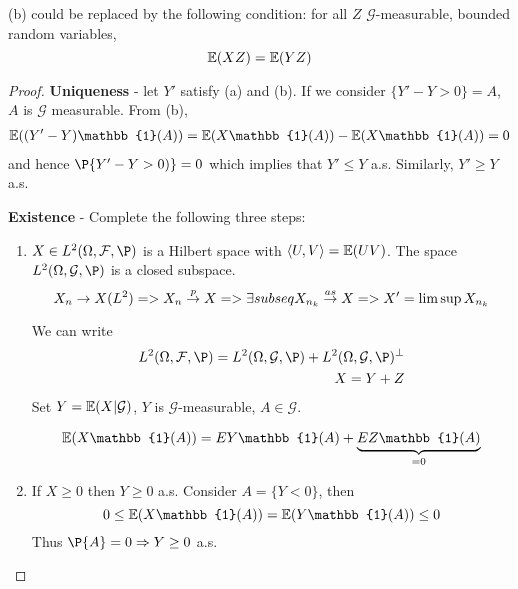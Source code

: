 \begin{remark}
  (b) could be replaced by the following condition: for all $Z$
  $\mathcal{G}$-measurable, bounded random variables,
  \begin{equation}
    \label{exmp:general:2}
    \E{XZ} = \E{YZ}
  \end{equation}
\end{remark}

\begin{proof}

  \textbf{Uniqueness} - let $Y'$ satisfy (a) and (b).  If we consider
  $\{Y' - Y > 0 \} = A$, $A$ is $\mathcal{G}$ measurable.
  From (b),
  \begin{align*}
    \E{(Y' - Y)\mathbb{1}(A)} = \E{X\mathbb{1}(A)} - \E{X
      \mathbb{1}(A)} = 0
  \end{align*} and hence $\P{Y' - Y > 0)} = 0$ which implies that $Y'
    \leq Y$ a.s.  Similarly, $Y' \geq Y$ a.s.

  \textbf{Existence} - Complete the following three steps:
  \begin{enumerate}
  \item $X \in L^2(\Omega, \mathcal{F}, \P)$ is a Hilbert space with
    $\langle U, V \rangle = \E{UV}$.
    The space $L^{2}(\Omega, \mathcal{G}, \P)$ is a closed
    subspace.
    \begin{equation}
      \label{exmp:general:3}
      X_{n} \rightarrow X (L^{2}) => X_{n} \overset{p}{\rightarrow} X => \exists subseq
      X_{n_{k}} \overset{as}{\rightarrow} X => X' = \limsup X_{n_{k}}
    \end{equation}

  We can write
  \begin{align*}
    L^{2}(\Omega, \mathcal{F}, \P) = L^{2}(\Omega, \mathcal{G}, \P) +
    L^{2}(\Omega, \mathcal{G}, \P)^{\perp} \\
    X = Y + Z
  \end{align*}  Set $Y = \E{X | \mathcal{G}}$, $Y$ is
  $\mathcal{G}$-measurable, $A \in \mathcal{G}$.
  
  \begin{align*}
    \E{X \mathbb{1}(A)} = E{Y \mathbb{1}(A)} + \underbrace{E{Z \mathbb{1}(A)}}_{=0}
  \end{align*}
  
\item   If $X \geq 0$ then $Y \geq 0$ a.s. Consider $A = \{ Y < 0 \}$, then
  \begin{equation}
    \label{exmp:general:4}
    0 \leq \E{X \mathbb{1}(A)} = \E{Y \mathbb{1}(A)} \leq 0
  \end{equation}
  Thus $\P{A} = 0 \Rightarrow Y \geq 0$ a.s.


\end{enumerate}
\end{proof}
